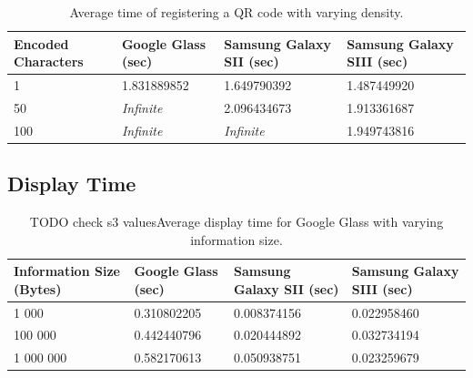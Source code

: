 	\begin{table}[H]%
    		\caption{Average time of registering a QR code with varying density.} \label{tab:complexityAverage}
		\centering \begin{tabularx}{\textwidth}{l|X|X|X} \hline
		\textbf{Encoded Characters} & \textbf{Google Glass (sec)} & \textbf{Samsung Galaxy SII (sec)} & \textbf{Samsung Galaxy SIII (sec)} \\ \hline \hline
       
		1	&1.831889852	&1.649790392	&1.487449920	\\ \hline
		50	&\textit{Infinite}	&2.096434673	&1.913361687	\\ \hline
		100	&\textit{Infinite}	&\textit{Infinite}	&1.949743816	\\ \hline
		
		\end{tabularx}
	\end{table}

\subsection{Display Time}

	\begin{table}[ht!]
    		\caption{TODO check s3 valuesAverage display time for Google Glass with varying information size.} \label{tab:averageDisplaySpeedGoogleGlass}
		\centering \begin{tabularx}{\textwidth}{l|X|X|X} \hline
		\textbf{Information Size (Bytes)} & \textbf{Google Glass (sec)}  & \textbf{Samsung Galaxy SII (sec)}  & \textbf{Samsung Galaxy SIII (sec)} \\ \hline \hline
       
		1 000	&0.310802205	&0.008374156	&0.022958460	 \\ \hline
		100 000 	&0.442440796	&0.020444892	&0.032734194	 \\ \hline
		1 000 000	&0.582170613	&0.050938751	&0.023259679	 \\ \hline

		\end{tabularx}
	\end{table}




